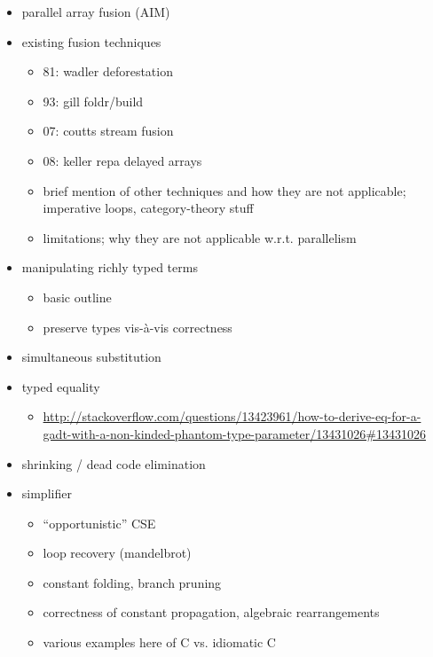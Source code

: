 \begin{itemize}
    \item parallel array fusion (AIM)
    \item existing fusion techniques
        \begin{itemize}
            \item 81: wadler deforestation
            \item 93: gill foldr/build
            \item 07: coutts stream fusion
            \item 08: keller repa delayed arrays
            \item brief mention of other techniques and how they are not
                applicable; imperative loops, category-theory stuff
            \item limitations; why they are not applicable w.r.t. parallelism
        \end{itemize}

    \item manipulating richly typed terms
        \begin{itemize}
            \item basic outline
            \item preserve types vis-\`a-vis correctness
        \end{itemize}

    \item simultaneous substitution
    \item typed equality
        \begin{itemize}
            \item \url{http://stackoverflow.com/questions/13423961/how-to-derive-eq-for-a-gadt-with-a-non-kinded-phantom-type-parameter/13431026#13431026}
        \end{itemize}

    \item shrinking / dead code elimination

    \item simplifier
        \begin{itemize}
            \item ``opportunistic'' CSE
            \item loop recovery (mandelbrot)
            \item constant folding, branch pruning
            \item correctness of constant propagation, algebraic rearrangements
            \item various examples here of C vs. idiomatic C
        \end{itemize}


\end{itemize}
